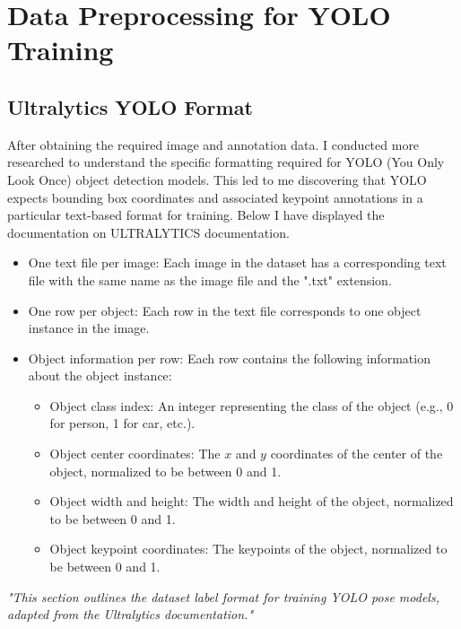 \section{Data Preprocessing for YOLO Training}
\subsection{Ultralytics YOLO Format}
After obtaining the required image and annotation data. I conducted more researched to understand the specific formatting required for YOLO (You Only Look Once) object detection models. This led to me discovering that YOLO expects bounding box coordinates and associated keypoint annotations in a particular text-based format for training. Below I have displayed the documentation on ULTRALYTICS documentation.

\begin{itemize}
    \item One text file per image: Each image in the dataset has a corresponding text file with the same name as the image file and the ".txt" extension.
    \item One row per object: Each row in the text file corresponds to one object instance in the image.
    \item Object information per row: Each row contains the following information about the object instance:
    \begin{itemize}
        \item Object class index: An integer representing the class of the object (e.g., 0 for person, 1 for car, etc.).
        \item Object center coordinates: The \(x\) and \(y\) coordinates of the center of the object, normalized to be between 0 and 1.
        \item Object width and height: The width and height of the object, normalized to be between 0 and 1.
        \item Object keypoint coordinates: The keypoints of the object, normalized to be between 0 and 1.
    \end{itemize}
\end{itemize}
\textit{"This section outlines the dataset label format for training YOLO pose models, adapted from the Ultralytics documentation."}

\newpage
